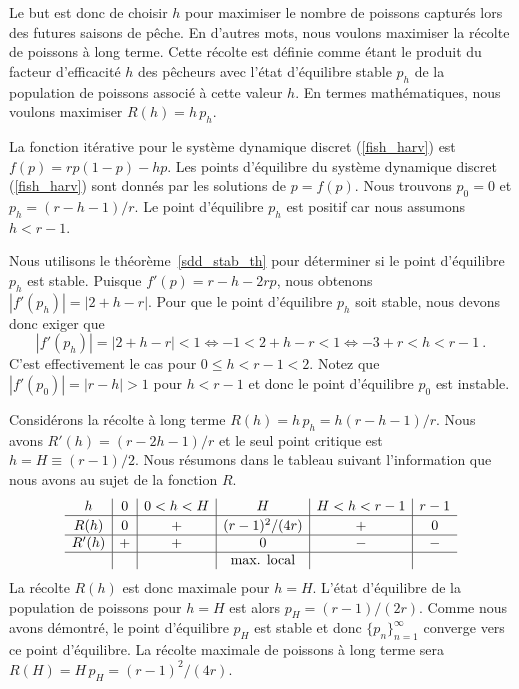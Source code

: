 {\begin{egg}
Le but est donc de choisir $h$ pour maximiser le nombre de poissons
capturés lors des futures saisons de pêche.  En d'autres mots, nous
voulons maximiser la récolte de poissons à long terme.  Cette récolte est
définie comme étant le produit du facteur d'efficacité $h$ des
pêcheurs avec l'état d'équilibre stable $p_h$ de la population de
poissons associé à cette valeur $h$.  En termes mathématiques, nous
voulons maximiser $R(h) = h\,p_h$.

La fonction itérative pour le système dynamique discret
(\ref{fish_harv}) est $f(p) = r p(1-p) - h p$.  Les points d'équilibre
du système dynamique discret (\ref{fish_harv}) sont donnés par les
solutions de $p = f(p)$.  Nous trouvons $p_0 = 0$ et $p_h = (r-h-1)/r$.  Le
point d'équilibre $p_h$ est positif car nous assumons $h < r-1$.

Nous utilisons le théorème~\ref{sdd_stab_th} pour déterminer si le point
d'équilibre $p_h$ est stable.  Puisque $f'(p) = r - h - 2r p$, nous
obtenons $|f'(p_h)| = |2 + h - r|$.  Pour que le point d'équilibre $p_h$
soit stable, nous devons donc exiger que
\[
|f'(p_h)| = |2 + h - r|<1 \Leftrightarrow -1 < 2 + h - r < 1
\Leftrightarrow -3 + r < h < r - 1 \ .
\]
C'est effectivement le cas pour $0 \leq h < r -1 < 2$.  Notez que
$|f'(p_0)| = |r - h| > 1$ pour $h < r -1$ et donc le point d'équilibre
$p_0$ est instable.

Considérons la récolte à long terme $R(h) = h\,p_h = h(r-h-1)/r$.
Nous avons $R'(h) = (r-2h-1)/r$ et le seul point critique est
$h = H \equiv (r-1)/2$.  Nous résumons dans le tableau suivant
l'information que nous avons au sujet de la fonction $R$.
\[
\begin{array}{c|c|c|c|c|c}
h & 0 & 0 < h < H & H & H < h < r-1 & r-1 \\
\hline
R(h) & 0 & + & \rule{0em}{1em} (r-1)^2/(4r) & + & 0 \\
\hline
R'(h) & + & + & 0 & - & - \\
\hline
 & & & \text{max. local} & & \\
\end{array}
\]
La récolte $R(h)$ est donc maximale pour $h = H$.  L'état d'équilibre
de la population de poissons pour $h = H$ est alors
$p_H = (r-1)/(2r)$.  Comme nous avons démontré, le point d'équilibre 
$p_H$ est stable et donc $\displaystyle \{p_n\}_{n=1}^\infty$ converge vers
ce point d'équilibre.  La récolte maximale de poissons à long terme
sera $R(H) = H\,p_H = (r-1)^2/(4r)$.
\label{discrete_fish_probl}
\end{egg}

}
